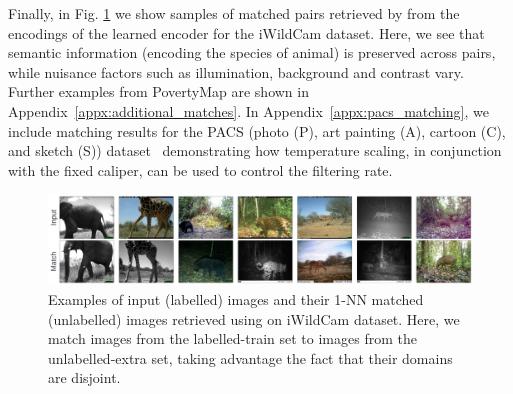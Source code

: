 Finally, in Fig. \ref{fig:matches_examples} we show samples of matched pairs retrieved by \CNN{}
from the encodings of the learned encoder for the iWildCam dataset.
%
Here, we see that semantic information (encoding the species of animal) is preserved across pairs,
while nuisance factors such as illumination, background and contrast vary.
%
Further examples from PovertyMap are shown in Appendix~\ref{appx:additional_matches}. In
Appendix~\ref{appx:pacs_matching}, we include matching results for the PACS (photo (P), art painting (A), cartoon (C), and
sketch (S))
dataset~\cite{li2017deeper} demonstrating how temperature scaling, in conjunction with the fixed
caliper, can be used to control the filtering rate.

\begin{figure}[tbp]
  \centering
  \includegraphics[width=1.\textwidth]{figures/matches_examples_2.pdf}
  \caption{
    Examples of input (labelled) images and their 1-NN matched (unlabelled) images retrieved using
    \CNN{} on iWildCam dataset. Here, we match images from the labelled-train set to images from
    the unlabelled-extra set, taking advantage the fact that their domains are disjoint.
  }
  \label{fig:matches_examples}
\end{figure}

